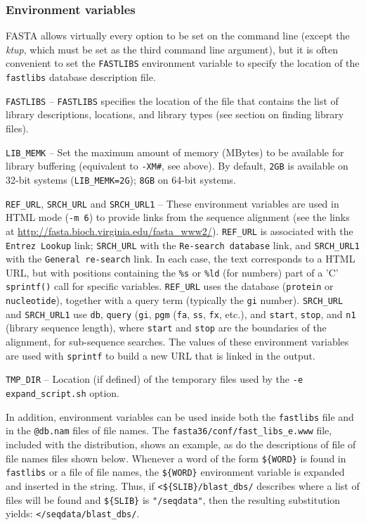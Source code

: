 \documentclass[11pt]{article}
\begin{document}
\subsubsection{Environment variables}

FASTA allows virtually every option to be set on the command line
(except the \emph{ktup}, which must be set as the third command line
argument), but it is often convenient to set the \texttt{FASTLIBS}
environment variable to specify the location of the \texttt{fastlibs}
database description file.

\texttt{FASTLIBS} -- \texttt{FASTLIBS}
specifies the location of the file that contains the list of library
descriptions, locations, and library types (see section on finding
library files).

\texttt{LIB\_MEMK} -- Set the maximum amount of memory (MBytes) to be
available for library buffering (equivalent to \texttt{-XM\#}, see
above).  By default, \texttt{2GB} is available on 32-bit systems
(\texttt{LIB\_MEMK=2G}); \texttt{8GB} on 64-bit systems.

\texttt{REF\_URL}, \texttt{SRCH\_URL} and \texttt{SRCH\_URL1} -- These
environment variables are used in HTML mode (\texttt{-m 6}) to provide
links from the sequence alignment (see the links at
\url{http://fasta.bioch.virginia.edu/fasta_www2/}). \texttt{REF\_URL}
is associated with the \texttt{Entrez Lookup} link; \texttt{SRCH\_URL}
with the \texttt{Re-search database} link, and \texttt{SRCH\_URL1}
with the \texttt{General re-search} link.  In each case, the text
corresponds to a HTML URL, but with positions containing the
\texttt{\%s} or \texttt{\%ld} (for numbers) part of a 'C'
\texttt{sprintf()} call for specific variables. \texttt{REF\_URL} uses
the database (\texttt{protein} or \texttt{nucleotide}), together with
a query term (typically the \texttt{gi} number). \texttt{SRCH\_URL}
and \texttt{SRCH\_URL1} use \texttt{db}, \texttt{query} (\texttt{gi},
\texttt{pgm} (\texttt{fa}, \texttt{ss}, \texttt{fx}, etc.), and
\texttt{start}, \texttt{stop}, and \texttt{n1} (library sequence
length), where \texttt{start} and \texttt{stop} are the boundaries of
the alignment, for sub-sequence searches.  The values of these
environment variables are used with \texttt{sprintf} to build a new
URL that is linked in the output.

\texttt{TMP\_DIR} -- Location (if defined) of the temporary files used
by the \texttt{-e expand\_script.sh} option.

In addition, environment variables can be used inside both the
\texttt{fastlibs} file and in the \texttt{@db.nam} files of file
names. The \texttt{fasta36/conf/fast\_libs\_e.www} file, included with
the distribution, shows an example, as do the descriptions of file of
file names files shown below. Whenever a word of the form
\texttt{\$\{WORD\}} is found in \texttt{fastlibs} or a file of file
names, the \texttt{\$\{WORD\}} environment variable is expanded and
inserted in the string.  Thus, if \texttt{<\$\{SLIB\}/blast\_dbs/}
describes where a list of files will be found and \texttt{\$\{SLIB\}}
is \texttt{"/seqdata"}, then the resulting substitution yields:
\texttt{</seqdata/blast\_dbs/}.
\end{document}
